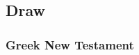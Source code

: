 	\subsection{Draw} %
		\label{DRAW}
		
		\subsubsection{Greek New Testament}
		
			\subparagraph{\texorpdfstring{}{}}
				\label{HELKO}
				
				
				\begin{compactdesc}
					\item[Some NT uses] \textbf{} %
						\begin{compactdesc}
							\item[{\hyperref[JOHN-6-44]{John 6:44}}]
							\item[{\hyperref[JOHN-12-32]{John 12:32}}]
						\end{compactdesc}
				\end{compactdesc}
			
